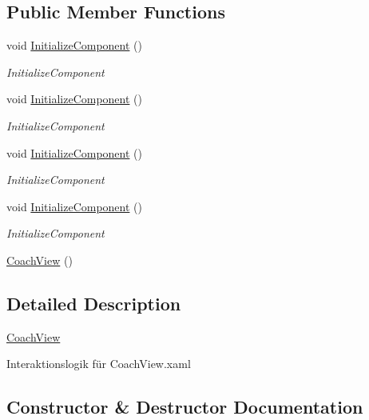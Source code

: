 \subsection*{Public Member Functions}
\begin{DoxyCompactItemize}
\item 
void \hyperlink{class_rowing_monitor_1_1_view_1_1_coach_view_a4751c9ab7f066dceb54766893a536101}{Initialize\+Component} ()
\begin{DoxyCompactList}\small\item\em Initialize\+Component \end{DoxyCompactList}\item 
void \hyperlink{class_rowing_monitor_1_1_view_1_1_coach_view_a4751c9ab7f066dceb54766893a536101}{Initialize\+Component} ()
\begin{DoxyCompactList}\small\item\em Initialize\+Component \end{DoxyCompactList}\item 
void \hyperlink{class_rowing_monitor_1_1_view_1_1_coach_view_a4751c9ab7f066dceb54766893a536101}{Initialize\+Component} ()
\begin{DoxyCompactList}\small\item\em Initialize\+Component \end{DoxyCompactList}\item 
void \hyperlink{class_rowing_monitor_1_1_view_1_1_coach_view_a4751c9ab7f066dceb54766893a536101}{Initialize\+Component} ()
\begin{DoxyCompactList}\small\item\em Initialize\+Component \end{DoxyCompactList}\item 
\hyperlink{class_rowing_monitor_1_1_view_1_1_coach_view_acc1611840e2208b5dacd8bdd1927fef0}{Coach\+View} ()
\end{DoxyCompactItemize}


\subsection{Detailed Description}
\hyperlink{class_rowing_monitor_1_1_view_1_1_coach_view}{Coach\+View} 

Interaktionslogik für Coach\+View.\+xaml 

\subsection{Constructor \& Destructor Documentation}
\mbox{\label{class_rowing_monitor_1_1_view_1_1_coach_view_acc1611840e2208b5dacd8bdd1927fef0}} 
